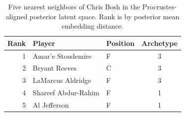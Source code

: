 \begin{table}[htbp]
  \centering\small
  \begin{tabular}{rllc}
    \toprule
    Rank & Player & Position & Archetype \\
    \midrule
    1 & Amar'e Stoudemire & F & 3 \\
    2 & Bryant Reeves & C & 3 \\
    3 & LaMarcus Aldridge & F & 3 \\
    4 & Shareef Abdur-Rahim & F & 1 \\
    5 & Al Jefferson & F & 1 \\
    \bottomrule
  \end{tabular}
  \caption{Five nearest neighbors of Chris Bosh in the Procrustes-aligned posterior latent space. Rank is by posterior mean embedding distance.}
  \label{tab:Chris_Bosh_neighbors}
\end{table}

